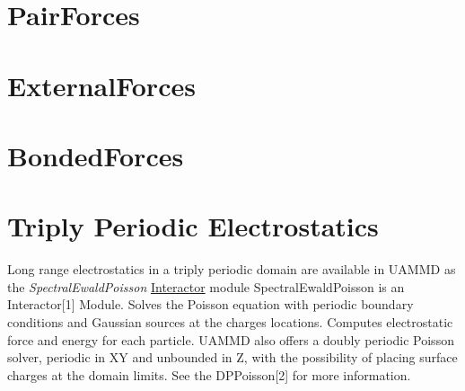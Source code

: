 \chapter{PairForces}
\chapter{ExternalForces}
\chapter{BondedForces}
\chapter{Triply Periodic Electrostatics} \label{ch:tppoisson}

Long range electrostatics in a triply periodic domain are available in \gls{UAMMD} as the \emph{SpectralEwaldPoisson} \hyperref[sec:interactor]{Interactor} module 
SpectralEwaldPoisson is an Interactor[1] Module.  
Solves the Poisson equation with periodic boundary conditions and Gaussian sources at the charges locations. Computes electrostatic force and energy for each particle. 
UAMMD also offers a doubly periodic Poisson solver, periodic in XY and unbounded in Z, with the possibility of placing surface charges at the domain limits. See the DPPoisson[2] for more information.
